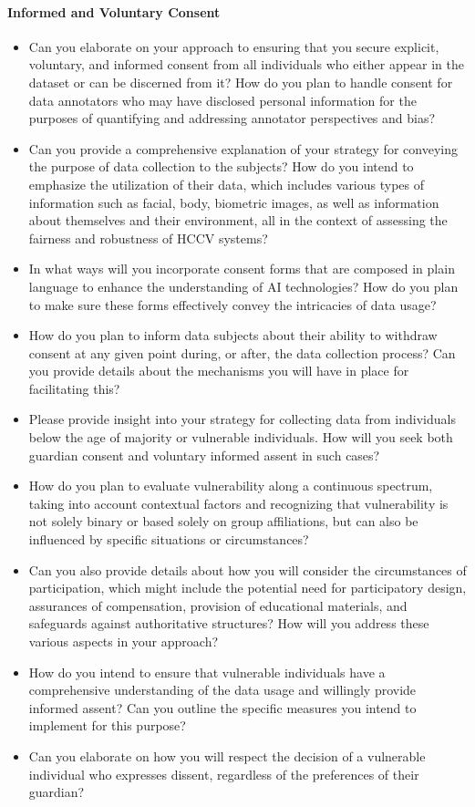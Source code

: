 \paragraph{Informed and Voluntary Consent} 
\begin{itemize}
    \item Can you elaborate on your approach to ensuring that you secure explicit,
    voluntary, and informed consent from all individuals who either appear in the
    dataset or can be discerned from it? How do you plan to handle consent for data
    annotators who may have disclosed personal information for the purposes of
    quantifying and addressing annotator perspectives and bias?
    \item Can you provide a comprehensive explanation of your strategy for conveying
    the purpose of data collection to the subjects? How do you intend to emphasize the
    utilization of their data, which includes various types of information such as
    facial, body, biometric images, as well as information about themselves and their
    environment, all in the context of assessing the fairness and robustness of HCCV
    systems?
    \item In what ways will you incorporate consent forms that are composed in plain
    language to enhance the understanding of AI technologies? How do you plan to make
    sure these forms effectively convey the intricacies of data usage?
    \item How do you plan to inform data subjects about their ability to withdraw
    consent at any given point during, or after, the data collection process? Can you
    provide details about the mechanisms you will have in place for facilitating this?
    \item Please provide insight into your strategy for collecting data from
    individuals below the age of majority or vulnerable individuals. How will you seek
    both guardian consent and voluntary informed assent in such cases?
    \item How do you plan to evaluate vulnerability along a continuous spectrum,
    taking into account contextual factors and recognizing that vulnerability is not
    solely binary or based solely on group affiliations, but can also be influenced
    by specific situations or circumstances?
    \item Can you also provide details about how you will consider the circumstances
    of participation, which might include the potential need for participatory design,
    assurances of compensation, provision of educational materials, and safeguards
    against authoritative structures? How will you address these various aspects in
    your approach?
    \item How do you intend to ensure that vulnerable individuals have a comprehensive
    understanding of the data usage and willingly provide informed assent? Can you
    outline the specific measures you intend to implement for this purpose?
    \item Can you elaborate on how you will respect the decision of a vulnerable
    individual who expresses dissent, regardless of the preferences of their guardian?
\end{itemize}

